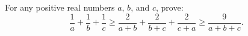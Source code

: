 \documentclass[varwidth]{standalone}
\begin{document}
    For any positive real numbers $a$, $b$, and $c$, prove:
    \[
        \frac{1}{a} + \frac{1}{b} + \frac{1}{c} \geq \frac{2}{a + b} + \frac{2}{b + c} + \frac{2}{c + a} \geq \frac{9}{a + b + c}.    
    \]
\end{document}
